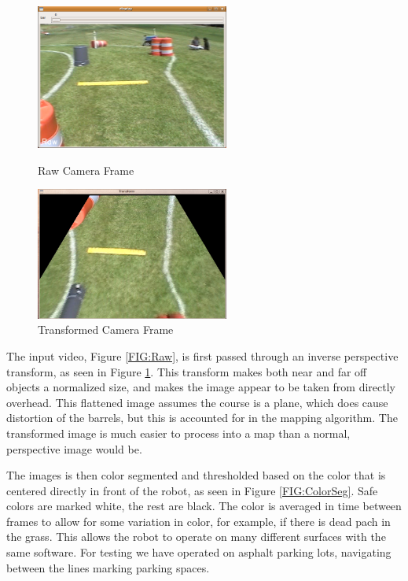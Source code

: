 \begin{figure}[H]
\begin{minipage}[b]{0.5\linewidth}
\centering
\includegraphics[width=2.5in]{./pics/raw.png}
\caption{Raw Camera Frame}
\label{FIG:Raw}
\end{minipage}
\hspace{0.1in}
\begin{minipage}[b]{0.5\linewidth}
\centering
\includegraphics[width=2.5in]{./pics/trans.png}
\caption{Transformed Camera Frame}
\label{FIG:Trans}
\end{minipage}
\end{figure}

The input video, Figure \ref{FIG:Raw}, is first passed through an inverse perspective transform, as seen in Figure \ref{FIG:Trans}. This transform makes both near and far off objects a normalized size, and makes the image appear to be taken from directly overhead. This flattened image assumes the course is a plane, which does cause distortion of the barrels, but this is accounted for in the mapping algorithm. The transformed image is much easier to process into a map than a normal, perspective image would be.

The images is then color segmented and thresholded based on the color that is centered directly in front of the robot, as seen in Figure \ref{FIG:ColorSeg}. Safe colors are marked white, the rest are black. The color is averaged in time between frames to allow for some variation in color, for example, if there is dead pach in the grass. This allows the robot to operate on many different surfaces with the same software. For testing we have operated on asphalt parking lots, navigating between the lines marking parking spaces.

